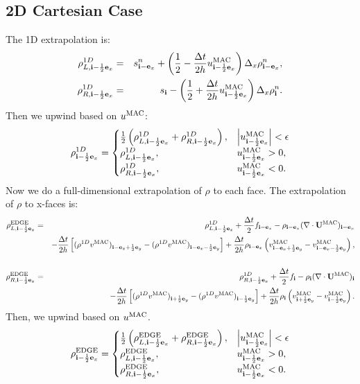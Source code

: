 \documentclass[11pt]{article}
\def\half  {\frac{1}{2}}
\def\dt    {\Delta t}
\def\edge  {\rm EDGE}
\def\mac   {\rm MAC}
\def\eb    {{\bf e}}
\def\ib    {{\bf i}}
\def\Ub    {{\bf U}}
\begin{document}
\subsection{2D Cartesian Case}
The 1D extrapolation is:
\begin{eqnarray}
\rho_{L,\ib-\half\eb_x}^{1D} &=& s_{\ib-\eb_x}^n + \left(\half - \frac{\dt}{2h}u_{\ib-\half\eb_x}^{\mac}\right)\Delta_x \rho_{\ib-\eb_x}^n, \\
\rho_{R,\ib-\half\eb_x}^{1D} &=& s_{\ib} - \left(\half + \frac{\dt}{2h}u_{\ib-\half\eb_x}^{\mac}\right)\Delta_x \rho_{\ib}^n.
\end{eqnarray}
Then we upwind based on $u^{\mac}$:
\begin{equation}
\rho_{\ib-\half\eb_x}^{1D} =
\begin{cases}
\half\left(\rho_{L,\ib-\half\eb_x}^{1D} + \rho_{R,\ib-\half\eb_x}^{1D}\right), & \left|u^{\mac}_{\ib-\half\eb_x}\right| < \epsilon \\
\rho_{L,\ib-\half\eb_x}^{1D}, & u^{\mac}_{\ib-\half\eb_x} > 0, \\
\rho_{R,\ib-\half\eb_x}^{1D}, & u^{\mac}_{\ib-\half\eb_x} < 0. \\
\end{cases}
\end{equation}
Now we do a full-dimensional extrapolation of $\rho$ to each face.  The extrapolation of $\rho$ to x-faces is:
\begin{eqnarray}
\rho_{L,\ib-\half\eb_x}^{\edge} &=& \rho_{L,\ib-\half\eb_x}^{1D} + \frac{\dt}{2}f_{\ib-\eb_x} - \rho_{\ib-\eb_x}(\nabla\cdot\Ub^{\mac})_{\ib-\eb_x} \nonumber \\
&&- \frac{\dt}{2h}\left[(\rho^{1D} v^{\mac})_{\ib-\eb_x+\half\eb_y} - (\rho^{1D} v^{\mac})_{\ib-\eb_x-\half\eb_y}\right] + \frac{\dt}{2h}\rho_{\ib-\eb_x}\left(v_{\ib-\eb_x+\half\eb_y}^{\mac} - v_{\ib-\eb_x-\half\eb_y}^{\mac}\right), \nonumber \\
&& \\
\rho_{R,\ib-\half\eb_x}^{\edge} &=& \rho_{R,\ib-\half\eb_x}^{1D} + \frac{\dt}{2}f_{\ib} - \rho_{\ib}(\nabla\cdot\Ub^{\mac})_{\ib} \nonumber \\
&&- \frac{\dt}{2h}\left[(\rho^{1D} v^{\mac})_{\ib+\half\eb_y} - (\rho^{1D} v^{\mac})_{\ib-\half\eb_y}\right] + \frac{\dt}{2h}\rho_{\ib}\left(v_{\ib+\half\eb_y}^{\mac} - v_{\ib-\half\eb_y}^{\mac}\right).
\end{eqnarray}
Then, we upwind based on $u^{\mac}$.
\begin{equation}
\rho_{\ib-\half\eb_x}^{\edge} =
\begin{cases}
\half\left(\rho_{L,\ib-\half\eb_x}^{\edge} + \rho_{R,\ib-\half\eb_x}^{\edge}\right), & \left|u^{\mac}_{\ib-\half\eb_x}\right| < \epsilon \\
\rho_{L,\ib-\half\eb_x}^{\edge}, & u^{\mac}_{\ib-\half\eb_x} > 0, \\
\rho_{R,\ib-\half\eb_x}^{\edge}, & u^{\mac}_{\ib-\half\eb_x} < 0.
\end{cases}
\end{equation}
\end{document}
